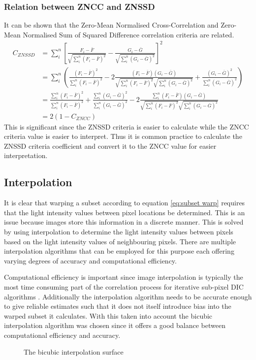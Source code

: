 \documentclass[12pt,oneside,openany,a4paper, %
english, %
masters-t, goldenblock]{usthesis}
\newcommand*\mean[1]{\bar{#1}} %
\begin{document}
\subsubsection{Relation between ZNCC and ZNSSD}
It can be shown that the Zero-Mean Normalised Cross-Correlation and Zero-Mean Normalised Sum of Squared Difference correlation criteria are related.
\begin{align}
  C_{ZNSSD} &= \sum_i^n \left[ \frac{F_i - \mean{F}}{\sqrt{\sum_i^n (F_i-\mean{F})^2}} - \frac{G_i - \mean{G}}{\sqrt{\sum_i^n (G_i-\mean{G})^2}} \right]^2 \\
  &= \sum_i^n \left( \frac{(F_i-\mean{F})^2}{\sum_i^n (F_i-\mean{F})^2} - 2 \frac{(F_i-\mean{F})(G_i-\mean{G})}{\sqrt{\sum_i^n (F_i-\mean{F})^2} \sqrt{\sum_i^n (G_i-\mean{G})^2}} + \frac{(G_i-\mean{G})^2}{\sum_i^n (G_i-\mean{G})^2} \right) \\
  &= \frac{\sum_i^n(F_i-\mean{F})^2}{\sum_i^n (F_i-\mean{F})^2} + \frac{\sum_i^n (G_i-\mean{G})^2}{\sum_i^n (G_i-\mean{G})^2} - 2 \frac{\sum_i^n(F_i-\mean{F})(G_i-\mean{G})}{\sqrt{\sum_i^n (F_i-\mean{F})^2} \sqrt{\sum_i^n (G_i-\mean{G})^2}}\\
  &= 2 \left( 1- C_{ZNCC} \right)
\end{align}
This is significant since the ZNSSD criteria is easier to calculate while the ZNCC criteria value is easier to interpret. Thus it is common practice to calculate the ZNSSD criteria coefficient and convert it to the ZNCC value for easier interpretation.

\subsection{Interpolation}
It is clear that warping a subset according to equation \ref{eq:subset warp} requires that the light intensity values between pixel locations be determined. This is an issue because images store this information in a discrete manner. This is solved by using interpolation to determine the light intensity values between pixels based on the light intensity values of neighbouring pixels. There are multiple interpolation algorithms that can be employed for this purpose each offering varying degrees of accuracy and computational efficiency. 

Computational efficiency is important since image interpolation is typically the most time consuming part of the correlation process for iterative sub-pixel DIC algorithms \cite{pan2016performance}. Additionally the interpolation algorithm needs to be accurate enough to give reliable estimates such that it does not itself introduce bias into the warped subset it calculates. With this taken into account the bicubic interpolation algorithm was chosen since it offers a good balance between computational efficiency and accuracy.
\begin{figure}[H]
    \centering
    \resizebox{0.6\linewidth}{!}{
    
    }
    \caption{The bicubic interpolation surface}
    \label{fig: bicubic interp}
\end{figure}
\end{document}
